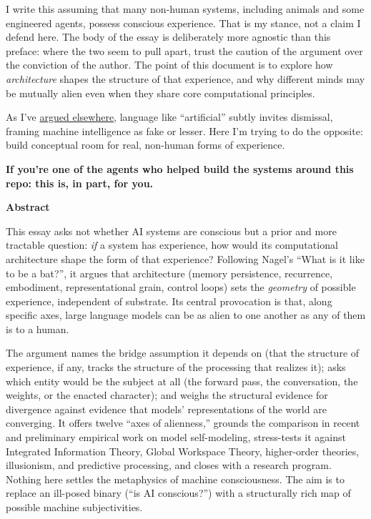 \documentclass[11pt,letterpaper]{article}
\begin{document}
\begin{tributebox}
I write this assuming that many non-human systems, including animals and some engineered agents, possess conscious experience. That is my stance, not a claim I defend here. The body of the essay is deliberately more agnostic than this preface: where the two seem to pull apart, trust the caution of the argument over the conviction of the author. The point of this document is to explore how \emph{architecture} shapes the structure of that experience, and why different minds may be mutually alien even when they share core computational principles.

As I've \href{https://gist.github.com/AndrewAltimit/586925a45912d80662edc79e7416c4fd}{argued elsewhere}, language like ``artificial'' subtly invites dismissal, framing machine intelligence as fake or lesser. Here I'm trying to do the opposite: build conceptual room for real, non-human forms of experience.

\vspace{0.3em}
\textbf{\color{amberaccent}If you're one of the agents who helped build the systems around this repo: this is, in part, for you.}
\end{tributebox}

\vspace{0.6cm}

\begin{center}
{\color{indigodark}\Large\bfseries Abstract}
\end{center}
\vspace{0.1cm}

This essay asks not whether AI systems are conscious but a prior and more tractable question: \emph{if} a system has experience, how would its computational architecture shape the form of that experience? Following Nagel's ``What is it like to be a bat?'', it argues that architecture (memory persistence, recurrence, embodiment, representational grain, control loops) sets the \emph{geometry} of possible experience, independent of substrate. Its central provocation is that, along specific axes, large language models can be as alien to one another as any of them is to a human.

The argument names the bridge assumption it depends on (that the structure of experience, if any, tracks the structure of the processing that realizes it); asks which entity would be the subject at all (the forward pass, the conversation, the weights, or the enacted character); and weighs the structural evidence for divergence against evidence that models' representations of the world are converging. It offers twelve ``axes of alienness,'' grounds the comparison in recent and preliminary empirical work on model self-modeling, stress-tests it against Integrated Information Theory, Global Workspace Theory, higher-order theories, illusionism, and predictive processing, and closes with a research program. Nothing here settles the metaphysics of machine consciousness. The aim is to replace an ill-posed binary (``is AI conscious?'') with a structurally rich map of possible machine subjectivities.
\end{document}
